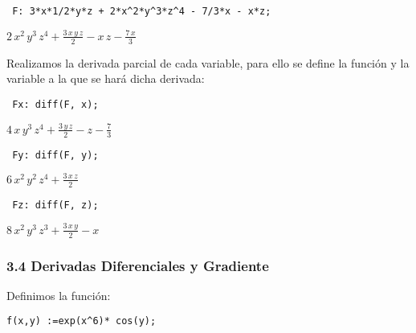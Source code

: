 \documentclass[12pt]{article}
\begin{document}
\begin{verbatim}
 F: 3*x*1/2*y*z + 2*x^2*y^3*z^4 - 7/3*x - x*z;
\end{verbatim}


\begin{math}
2\,{x}^{2}\,{y}^{3}\,{z}^{4}+\frac{3\,x\,y\,z}{2}-x\,z-\frac{7\,x}{3}
\end{math}


Realizamos la derivada parcial de cada variable, para ello se define la función y la variable a la que se hará dicha derivada:


\noindent


\begin{verbatim}
 Fx: diff(F, x);
\end{verbatim}


\begin{math}
4\,x\,{y}^{3}\,{z}^{4}+\frac{3\,y\,z}{2}-z-\frac{7}{3}
\end{math}

\noindent

\begin{verbatim}
 Fy: diff(F, y);
\end{verbatim}

\begin{math}
6\,{x}^{2}\,{y}^{2}\,{z}^{4}+\frac{3\,x\,z}{2}
\end{math}

\noindent

\begin{verbatim}
 Fz: diff(F, z);
\end{verbatim}


\begin{math}
8\,{x}^{2}\,{y}^{3}\,{z}^{3}+\frac{3\,x\,y}{2}-x
\end{math}

\subsubsection*{3.4 Derivadas Diferenciales y Gradiente}

Definimos la función:
\noindent

\begin{verbatim}
f(x,y) :=exp(x^6)* cos(y);
\end{verbatim}
\end{document}
